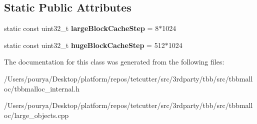 \subsection*{Static Public Attributes}
\begin{DoxyCompactItemize}
\item 
\hypertarget{classrml_1_1internal_1_1LargeObjectCache_a325f9d87a0665cbf8be8386665d048a3}{}static const uint32\+\_\+t {\bfseries large\+Block\+Cache\+Step} = 8$\ast$1024\label{classrml_1_1internal_1_1LargeObjectCache_a325f9d87a0665cbf8be8386665d048a3}

\item 
\hypertarget{classrml_1_1internal_1_1LargeObjectCache_a7d3a6140bb51024ba92aa372f9e55eb6}{}static const uint32\+\_\+t {\bfseries huge\+Block\+Cache\+Step} = 512$\ast$1024\label{classrml_1_1internal_1_1LargeObjectCache_a7d3a6140bb51024ba92aa372f9e55eb6}

\end{DoxyCompactItemize}


The documentation for this class was generated from the following files\+:\begin{DoxyCompactItemize}
\item 
/\+Users/pourya/\+Desktop/platform/repos/tetcutter/src/3rdparty/tbb/src/tbbmalloc/tbbmalloc\+\_\+internal.\+h\item 
/\+Users/pourya/\+Desktop/platform/repos/tetcutter/src/3rdparty/tbb/src/tbbmalloc/large\+\_\+objects.\+cpp\end{DoxyCompactItemize}
